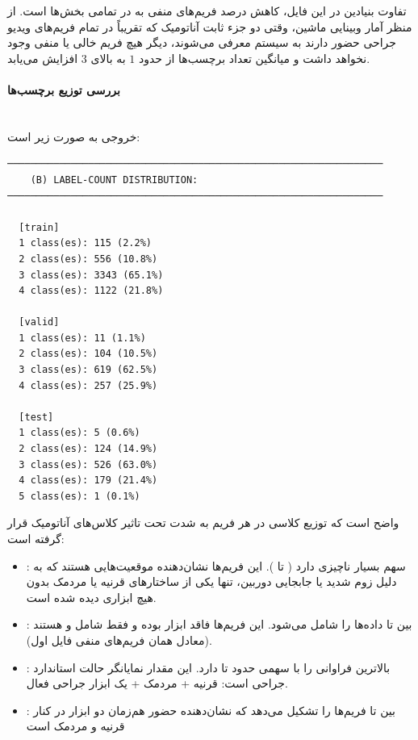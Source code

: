 \documentclass{article}
\begin{document}
تفاوت بنیادین در این فایل، کاهش درصد فریم‌های منفی به  در تمامی بخش‌ها است. از منظر آمار وبینایی ماشین، وقتی دو جزء ثابت آناتومیک که تقریباً در تمام فریم‌های ویدیو جراحی حضور دارند به سیستم معرفی می‌شوند، دیگر هیچ فریم خالی یا منفی وجود نخواهد داشت و میانگین تعداد برچسب‌ها از حدود $1$ به بالای $3$ افزایش می‌یابد.
\paragraph{بررسی توزیع برچسب‌ها}\mbox{}\\
خروجی به صورت زیر است:

\begin{latin}
\begin{LTR}
\begin{verbatim}
─────────────────────────────────────────────────────────────────
    (B) LABEL-COUNT DISTRIBUTION:   
─────────────────────────────────────────────────────────────────

  [train]
  1 class(es): 115 (2.2%)
  2 class(es): 556 (10.8%)
  3 class(es): 3343 (65.1%)
  4 class(es): 1122 (21.8%)

  [valid]
  1 class(es): 11 (1.1%)
  2 class(es): 104 (10.5%)
  3 class(es): 619 (62.5%)
  4 class(es): 257 (25.9%)

  [test]
  1 class(es): 5 (0.6%)
  2 class(es): 124 (14.9%)
  3 class(es): 526 (63.0%)
  4 class(es): 179 (21.4%)
  5 class(es): 1 (0.1%)

\end{verbatim}
\end{LTR}
\end{latin}
واضح است که توزیع کلاسی در هر فریم به شدت تحت تاثیر کلاس‌های آناتومیک قرار گرفته است:
\begin{itemize}
\item {}: سهم بسیار ناچیزی دارد ( تا ). این فریم‌ها نشان‌دهنده موقعیت‌هایی هستند که به دلیل زوم شدید یا جابجایی دوربین، تنها یکی از ساختارهای قرنیه یا مردمک بدون هیچ ابزاری دیده شده است. 
\item {}: بین  تا  داده‌ها را شامل می‌شود. این فریم‌ها فاقد ابزار بوده و فقط شامل  و  هستند (معادل همان فریم‌های منفی فایل اول).  
\item {}: بالاترین فراوانی را با سهمی حدود  تا  دارد. این مقدار نمایانگر حالت استاندارد جراحی است: قرنیه + مردمک + یک ابزار جراحی فعال.  
\item {}: بین  تا  فریم‌ها را تشکیل می‌دهد که نشان‌دهنده حضور هم‌زمان دو ابزار در کنار قرنیه و مردمک است
\end{itemize}
\end{document}
